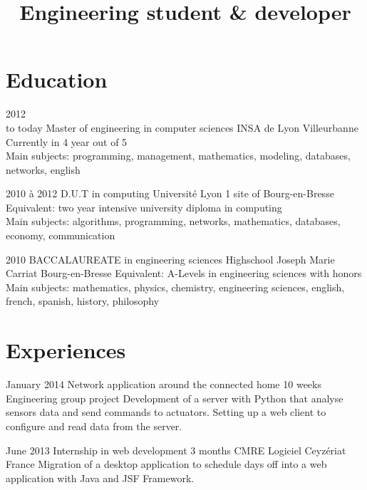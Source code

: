 \documentclass[10pt,a4paper]{moderncv}
\title{Engineering student \& developer}
\begin{document}
\maketitle
\pagestyle{empty}


\section{Education}

\cventry
	{2012\\to today}
	{Master of engineering in computer sciences}
	{INSA de Lyon}
	{Villeurbanne}
	{}
	{Currently in 4 year out of 5\\Main subjects: programming, management, mathematics, modeling, databases, networks, english}

\cventry
	{2010 à 2012}
	{D.U.T in computing}
	{Université Lyon 1}
	{site of Bourg-en-Bresse}
	{}
	{Equivalent: two year intensive university diploma in computing\\Main subjects: algorithms, programming, networks, mathematics, databases, economy, communication}

\cventry
	{2010}
	{BACCALAUREATE in engineering sciences}
	{Highschool Joseph Marie Carriat}
	{Bourg-en-Bresse}
	{}
	{Equivalent: A-Levels in engineering sciences with honors\\Main subjects: mathematics, physics, chemistry, engineering sciences, english, french, spanish, history, philosophy}


\section{Experiences}

\cventry
	{January 2014}
	{Network application around the connected home}
	{10 weeks}
	{}
	{Engineering group project}
	{Development of a server with Python that analyse sensors data and send commands to actuators. Setting up a web client to configure and read data from the server.}

\cventry
	{June 2013}
	{Internship in web development}
	{3 months}
	{CMRE Logiciel}
	{Ceyzériat France}
	{Migration of a desktop application to schedule days off into a web application with Java and JSF Framework.}
\end{document}

